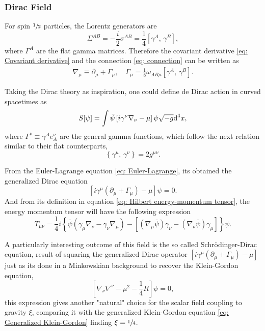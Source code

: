 \subsubsection{Dirac Field}
For spin $\sfrac{1}{2}$ particles, the Lorentz generators are
\begin{equation}
	\Sigma^{AB}=-\frac{i}{2}\sigma^{AB}=\frac{1}{4}\left[\gamma^A,\,\gamma^B\right],
\end{equation}
where $\Gamma^A$ are the flat gamma matrices. Therefore the covariant derivative \ref{eq: Covariant derivative} and the connection \ref{eq: connection} can be written as
\begin{subequations}
	\begin{gather}
		\nabla_\mu\equiv\partial_\mu+\Gamma_\mu,\quad \Gamma_\mu=\frac{1}{8}\omega_{AB\mu}\left[\gamma^A,\,\gamma^B\right].
	\end{gather}
\end{subequations}

Taking the Dirac theory as inspiration, one could define de Dirac action in curved spacetimes as
\begin{equation}
	S[\psi]=\int \bar{\psi}\left[i\gamma^\nu\nabla_\nu-\mu\right]\psi\sqrt{-g}\text{d}^4x,
\end{equation}
where $\Gamma^\nu\equiv \gamma^Ae^\nu_A$ are the general gamma functions, which follow the next relation similar to their flat counterparts,
\begin{equation}
	\left\{\gamma^\mu,\,\gamma^\nu\right\}=2g^{\mu\nu}.
\end{equation}

From the Euler-Lagrange equation \ref{eq: Euler-Lagrange}, its obtained the generalized Dirac equation
\begin{equation}
	\left[i\gamma^\mu\left(\partial_\mu+\Gamma_\mu\right)-\mu\right]\psi=0.
\end{equation}
And from its definition in equation \ref{eq: Hilbert energy-momentum tensor}, the energy momentum tensor will have \cite[sec.\,3.8]{BirrelDavies} the following expression
\begin{equation}
	T_{\mu\nu}=\frac{1}{4}i\left\{\bar{\psi}\left(\gamma_\mu\nabla_\nu-\gamma_\nu\nabla_\mu\right)-\left[\left(\nabla_\mu\bar{\psi}\right)\gamma_\nu-\left(\nabla_\nu\bar{\psi}\right)\gamma_\mu\right]\right\}\psi.
\end{equation}

A particularly interesting outcome of this field is the so called Schrödinger-Dirac equation, result of squaring the generalized Dirac operator $\left[i\gamma^\mu\left(\partial_\mu+\Gamma_\mu\right)-\mu\right]$ just as its done in a Minkowskian background to recover the Klein-Gordon equation,
\begin{equation}
	\left[\nabla_\nu\nabla^\nu-\mu^2-\frac{1}{4}R\right]\psi=0,
\end{equation}
this expression gives another "natural" choice for the scalar field coupling to gravity $\xi$, comparing it with the generalized Klein-Gordon equation \ref{eq: Generalized Klein-Gordon} finding $\xi=\sfrac{1}{4}$.


